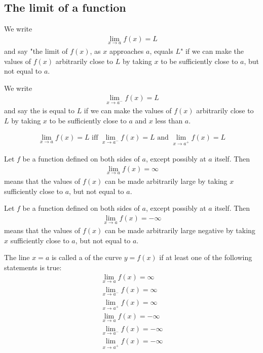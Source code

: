 \documentclass{article}
\begin{document}
\subsection{The limit of a function}
\begin{definition}
    We write
    \begin{align*}
        \lim_{x\to a} f(x) = L
    \end{align*}
    and say "the limit of $f(x)$, as $x$ approaches $a$, equals $L$" if we can make the values of $f(x)$ arbitrarily close to $L$ by taking $x$ to be sufficiently close to $a$, but not equal to $a$.
\end{definition}
\begin{definition}
    We write
    \begin{align*}
        \lim_{x\to a^-}f(x) = L
    \end{align*}
    and say the  is equal to $L$ if we can make the values of $f(x)$ arbitrarily close to $L$ by taking $x$ to be sufficiently close to $a$ and $x$ less than $a$. 
\end{definition}
\begin{theorem}
    \begin{align*}
        \lim_{x\to a}f(x) = L \text{ iff } \lim_{x\to a^-}f(x) = L \text{ and } \lim_{x\to a^+}f(x) = L
    \end{align*}
\end{theorem}
\begin{definition}
    Let $f$ be a function defined on both sides of $a$, except possibly at $a$ itself. Then
    \begin{align*}
        \lim_{x\to a} f(x) = \infty
    \end{align*}
    means that the values of $f(x)$ can be made arbitrarily large by taking $x$ sufficiently close to $a$, but not equal to $a$.
\end{definition}
\begin{definition}
    Let $f$ be a function defined on both sides of $a$, except possibly at $a$ itself. Then
    \begin{align*}
        \lim_{x\to a} f(x) = -\infty
    \end{align*}
    means that the values of $f(x)$ can be made arbitrarily large negative by taking $x$ sufficiently close to $a$, but not equal to $a$.
\end{definition}
\begin{definition}
    The line $x=a$ is called a  of the curve $y=f(x)$ if at least one of the following statements is true:
    \begin{align*}
        \lim_{x\to a}f(x) = \infty\\
        \lim_{x\to a^-}f(x) = \infty\\
        \lim_{x\to a^+}f(x) = \infty\\
        \lim_{x\to a}f(x) = -\infty\\
        \lim_{x\to a^-}f(x) = -\infty\\
        \lim_{x\to a^+}f(x) = -\infty
    \end{align*}
\end{definition}
\end{document}
